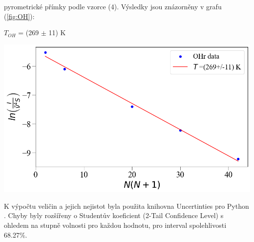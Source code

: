 \documentclass[a4paper,11pt]{article}
\begin{document}
    \begin{minipage}[t]{0.5\textwidth} 
                pyrometrické přímky podle vzorce (4). Výsledky jsou znázorněny v grafu (\ref{fig:OH}):
                \begin{center}
                    $T_{OH}$ = (269 $\pm$ 11) K
                \end{center}

                \vspace{10pt}   
                \par \centering
                \includegraphics[scale=0.33]{OH}
                \captionsetup{justification=centering, font=footnotesize}
                \label{fig:OH}
                \vspace{10pt}
                \raggedright 

                \vspace{10pt}
                \par K výpočtu veličin a jejich nejistot byla použita knihovna Uncertinties pro Python \cite{uncertainties}. Chyby byly rozšířeny o Studentův koeficient (2-Tail Confidence Level) s ohledem na stupně volnosti pro každou hodnotu, pro interval spolehlivosti 68.27\%.


\end{minipage}
\end{document}
